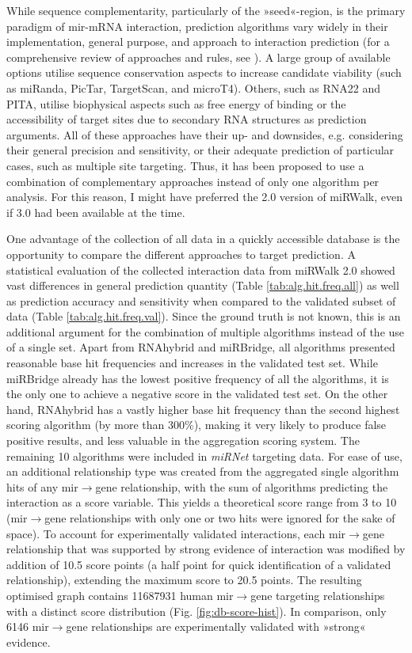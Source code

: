 While sequence complementarity, particularly of the »seed«-region, is the primary paradigm of \ac{mir}-mRNA interaction, prediction algorithms vary widely in their implementation, general purpose, and approach to interaction prediction (for a comprehensive review of approaches and rules, see \cite{Yue2009}). A large group of available options utilise sequence conservation aspects to increase candidate viability (such as miRanda, PicTar, TargetScan, and microT4). Others, such as RNA22 and PITA, utilise biophysical aspects such as free energy of binding or the accessibility of target sites due to secondary RNA structures as prediction arguments. All of these approaches have their up- and downsides, e.g. considering their general precision and sensitivity, or their adequate prediction of particular cases, such as multiple site targeting. Thus, it has been proposed to use a combination of complementary approaches instead of only one algorithm per analysis\cite{Witkos2011}. For this reason, I might have preferred the 2.0 version of miRWalk, even if 3.0 had been available at the time.

One advantage of the collection of all data in a quickly accessible database is the opportunity to compare the different approaches to target prediction. A statistical evaluation of the collected interaction data from miRWalk 2.0 showed vast differences in general prediction quantity (Table \ref{tab:alg.hit.freq.all}) as well as prediction accuracy and sensitivity when compared to the validated subset of data (Table \ref{tab:alg.hit.freq.val}). Since the ground truth is not known, this is an additional argument for the combination of multiple algorithms instead of the use of a single set. Apart from RNAhybrid and miRBridge, all algorithms presented reasonable base hit frequencies and increases in the validated test set. While miRBridge already has the lowest positive frequency of all the algorithms, it is the only one to achieve a negative score in the validated test set. On the other hand, RNAhybrid has a vastly higher base hit frequency than the second highest scoring algorithm (by more than 300\%), making it very likely to produce false positive results, and less valuable in the aggregation scoring system. The remaining 10 algorithms were included in \textit{miRNet} targeting data. For ease of use, an additional relationship type was created from the aggregated single algorithm hits of any \ac{mir}$\to$gene relationship, with the sum of algorithms predicting the interaction as a score variable. This yields a theoretical score range from 3 to 10 (\ac{mir}$\to$gene relationships with only one or two hits were ignored for the sake of space). To account for experimentally validated interactions, each \ac{mir}$\to$gene relationship that was supported by strong evidence of interaction was modified by addition of 10.5 score points (a half point for quick identification of a validated relationship), extending the maximum score to \num{20.5} points. The resulting optimised graph contains \num{11687931} human \ac{mir}$\to$gene targeting relationships with a distinct score distribution (Fig. \ref{fig:db-score-hist}). In comparison, only 6146 \ac{mir}$\to$gene relationships are experimentally validated with »strong« evidence.

